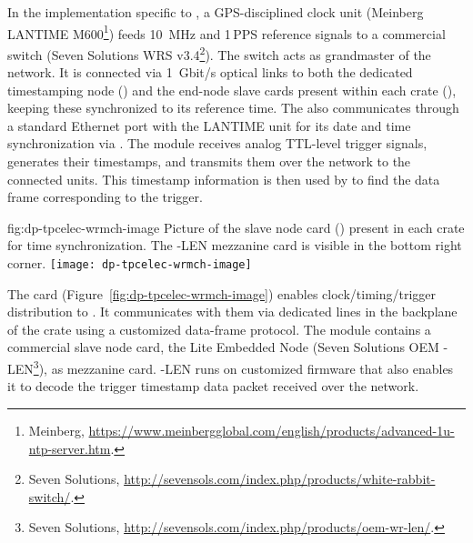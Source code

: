 In the implementation specific to , a GPS-disciplined clock unit (Meinberg LANTIME M600\footnote{Meinberg\texttrademark{}, \url{https://www.meinbergglobal.com/english/products/advanced-1u-ntp-server.htm}.}) feeds \SI{10}{MHz} and \num{1}\,PPS reference signals to a commercial  switch (Seven Solutions WRS v3.4\footnote{Seven Solutions\texttrademark{}, \url{http://sevensols.com/index.php/products/white-rabbit-switch/}.}). The switch acts as grandmaster of the  network. It is connected via \SI{1}{Gbit/s} optical links to both the dedicated  timestamping node () and the  end-node slave cards present within each  crate (), keeping these synchronized to its reference time. The  also communicates through a standard Ethernet port with the LANTIME unit for its date and time synchronization via . The  module receives analog TTL-level trigger signals, generates their timestamps, and transmits them over the  network to the connected  units. This timestamp information is then used by  to find the data frame corresponding to the trigger.  

\begin{dunefigure}{fig:dp-tpcelec-wrmch-image}
{Picture of the  slave node card () present in each  crate for time synchronization. The -LEN mezzanine card is visible in the bottom right corner.}
\texttt{[image: dp-tpcelec-wrmch-image]}
\end{dunefigure}

The  card (Figure~\ref{fig:dp-tpcelec-wrmch-image}) enables clock/timing/trigger distribution to . It communicates with them via dedicated lines in the backplane of the  crate using a customized data-frame protocol. The module contains a commercial  slave node card, the  Lite Embedded Node (Seven Solutions OEM -LEN\footnote{Seven Solutions\texttrademark{}, \url{http://sevensols.com/index.php/products/oem-wr-len/}.}), as mezzanine card. -LEN runs on customized firmware that also enables it to decode the trigger timestamp data packet received over the  network.

